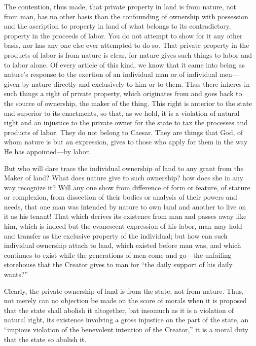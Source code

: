 \documentclass{book}
\begin{document}
The contention, thus made, that private property in land is from nature, not from man, has no other basis than the confounding of ownership with possession and the ascription to property in land of what belongs to its contradictory, property in the proceeds of labor. You do not attempt to show for it any other basis, nor has any one else ever attempted to do so. That private property in the products of labor is from nature is clear, for nature gives such things to labor and to labor alone. Of every article of this kind, we know that it came into being as nature’s response to the exertion of an individual man or of individual men—given by nature directly and exclusively to him or to them. Thus there inheres in such things a right of private property, which originates from and goes back to the source of ownership, the maker of the thing. This right is anterior to the state and superior to its enactments, so that, as we hold, it is a violation of natural right and an injustice to the private owner for the state to tax the processes and products of labor. They do not belong to Caesar. They are things that God, of whom nature is but an expression, gives to those who apply for them in the way He has appointed—by labor.

But who will dare trace the individual ownership of land to any grant from the Maker of land? What does nature give to such ownership? how does she in any way recognize it? Will any one show from difference of form or feature, of stature or complexion, from dissection of their bodies or analysis of their powers and needs, that one man was intended by nature to own land and another to live on it as his tenant! That which derives its existence from man and passes away like him, which is indeed but the evanescent expression of his labor, man may hold and transfer as the exclusive property of the individual; but how can such individual ownership attach to land, which existed before man was, and which continues to exist while the generations of men come and go—the unfailing storehouse that the Creator gives to man for “the daily support of his daily wants?”

Clearly, the private ownership of land is from the state, not from nature. Thus, not merely can no objection be made on the score of morals when it is proposed that the state shall abolish it altogether, bat insomuch as it is a violation of natural right, its existence involving a gross injustice on the part of the state, an “impious violation of the benevolent intention of the Creator,” it is a moral duty that the state so abolish it.
\end{document}
